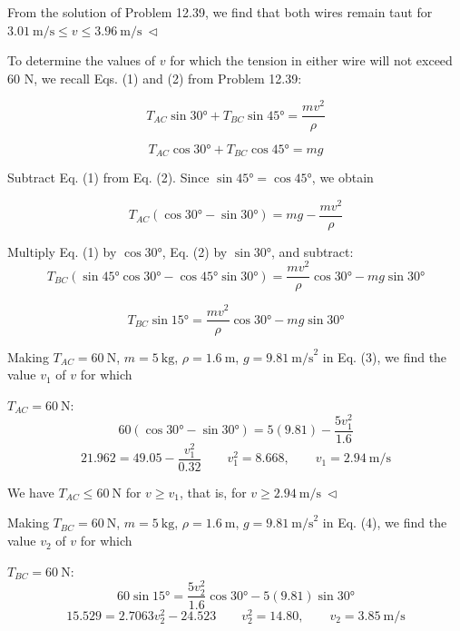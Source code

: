 \documentclass[12pt,a3paper]{article}
\begin{document}
\begin{enumerate}
\begin{tcolorbox}[enhanced,breakable,ansbox,colback=cG!4,colframe=cG,
  boxrule=0.8pt,arc=5pt,
  title={\textbf{Solution}},fonttitle=\bfseries\color{white},
  colbacktitle=cG]

From the solution of Problem 12.39, we find that both wires remain taut for
\hfill $3.01\ \text{m/s} \leq v \leq 3.96\ \text{m/s}\ \triangleleft$

To determine the values of $v$ for which the tension in either wire will not exceed 60 N, we recall Eqs. (1) and (2) from Problem 12.39:

\begin{equation}
  T_{AC}\sin 30° + T_{BC}\sin 45° = \frac{mv^2}{\rho}
\end{equation}

\begin{equation}
  T_{AC}\cos 30° + T_{BC}\cos 45° = mg
\end{equation}

Subtract Eq. (1) from Eq. (2). Since $\sin 45° = \cos 45°$, we obtain

\begin{equation}
  T_{AC}(\cos 30° - \sin 30°) = mg - \frac{mv^2}{\rho}
\end{equation}

Multiply Eq. (1) by $\cos 30°$, Eq. (2) by $\sin 30°$, and subtract:
\[
  T_{BC}(\sin 45°\cos 30° - \cos 45°\sin 30°) = \frac{mv^2}{\rho}\cos 30° - mg\sin 30°
\]

\begin{equation}
  T_{BC}\sin 15° = \frac{mv^2}{\rho}\cos 30° - mg\sin 30°
\end{equation}

Making $T_{AC} = 60\ \text{N}$, $m = 5\ \text{kg}$, $\rho = 1.6\ \text{m}$, $g = 9.81\ \text{m/s}^2$ in Eq. (3), we find the value $v_1$ of $v$ for which

$T_{AC} = 60\ \text{N}$:
\[
  60(\cos 30° - \sin 30°) = 5(9.81) - \frac{5v_1^2}{1.6}
\]
\[
  21.962 = 49.05 - \frac{v_1^2}{0.32} \qquad v_1^2 = 8.668, \qquad v_1 = 2.94\ \text{m/s}
\]

We have $T_{AC} \leq 60\ \text{N}$ for $v \geq v_1$, that is, for
\hfill $v \geq 2.94\ \text{m/s}\ \triangleleft$

\medskip
Making $T_{BC} = 60\ \text{N}$, $m = 5\ \text{kg}$, $\rho = 1.6\ \text{m}$, $g = 9.81\ \text{m/s}^2$ in Eq. (4), we find the value $v_2$ of $v$ for which

$T_{BC} = 60\ \text{N}$:
\[
  60\sin 15° = \frac{5v_2^2}{1.6}\cos 30° - 5(9.81)\sin 30°
\]
\[
  15.529 = 2.7063v_2^2 - 24.523 \qquad v_2^2 = 14.80, \qquad v_2 = 3.85\ \text{m/s}
\]


\end{tcolorbox}
\end{enumerate}
\end{document}
